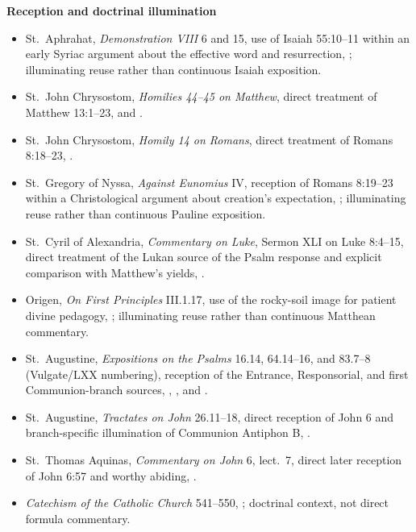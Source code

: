 \begin{deepstudy}
\textbf{Reception and doctrinal illumination}
{\footnotesize
\begin{itemize}[itemsep=0em,topsep=0.15em,parsep=0pt]
\item St.~Aphrahat, \emph{Demonstration VIII} 6 and 15, use of Isaiah 55:10--11 within an early Syriac argument about the effective word and resurrection, ; illuminating reuse rather than continuous Isaiah exposition.
\item St.~John Chrysostom, \emph{Homilies 44--45 on Matthew}, direct treatment of Matthew 13:1--23,  and .
\item St.~John Chrysostom, \emph{Homily 14 on Romans}, direct treatment of Romans 8:18--23, .
\item St.~Gregory of Nyssa, \emph{Against Eunomius} IV, reception of Romans 8:19--23 within a Christological argument about creation's expectation, ; illuminating reuse rather than continuous Pauline exposition.
\item St.~Cyril of Alexandria, \emph{Commentary on Luke}, Sermon XLI on Luke 8:4--15, direct treatment of the Lukan source of the Psalm response and explicit comparison with Matthew's yields, .
\item Origen, \emph{On First Principles} III.1.17, use of the rocky-soil image for patient divine pedagogy, ; illuminating reuse rather than continuous Matthean commentary.
\item St.~Augustine, \emph{Expositions on the Psalms} 16.14, 64.14--16, and 83.7--8 (Vulgate/LXX numbering), reception of the Entrance, Responsorial, and first Communion-branch sources, , , and .
\item St.~Augustine, \emph{Tractates on John} 26.11--18, direct reception of John 6 and branch-specific illumination of Communion Antiphon B, .
\item St.~Thomas Aquinas, \emph{Commentary on John} 6, lect.~7, direct later reception of John 6:57 and worthy abiding, .
\item \emph{Catechism of the Catholic Church} 541--550, ; doctrinal context, not direct formula commentary.
\end{itemize}}




\end{deepstudy}
